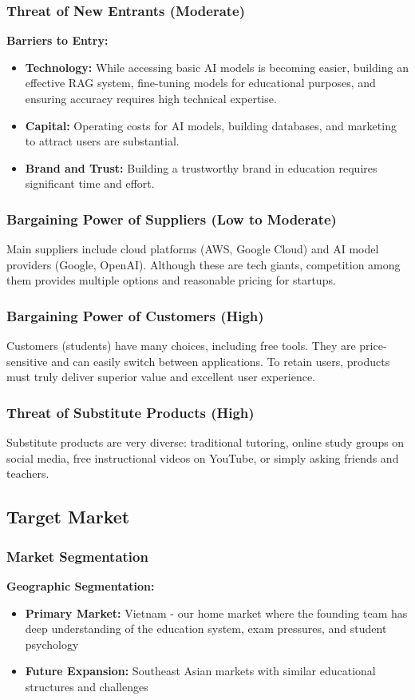 \subsubsection{Threat of New Entrants (Moderate)}
\textbf{Barriers to Entry:}
\begin{itemize}
    \item \textbf{Technology:} While accessing basic AI models is becoming easier, building an effective RAG system, fine-tuning models for educational purposes, and ensuring accuracy requires high technical expertise.
    \item \textbf{Capital:} Operating costs for AI models, building databases, and marketing to attract users are substantial.
    \item \textbf{Brand and Trust:} Building a trustworthy brand in education requires significant time and effort.
\end{itemize}

\subsubsection{Bargaining Power of Suppliers (Low to Moderate)}
Main suppliers include cloud platforms (AWS, Google Cloud) and AI model providers (Google, OpenAI). Although these are tech giants, competition among them provides multiple options and reasonable pricing for startups.

\subsubsection{Bargaining Power of Customers (High)}
Customers (students) have many choices, including free tools. They are price-sensitive and can easily switch between applications. To retain users, products must truly deliver superior value and excellent user experience.

\subsubsection{Threat of Substitute Products (High)}
Substitute products are very diverse: traditional tutoring, online study groups on social media, free instructional videos on YouTube, or simply asking friends and teachers.

\subsection{Target Market}
\subsubsection{Market Segmentation}
\textbf{Geographic Segmentation:}
\begin{itemize}
    \item \textbf{Primary Market:} Vietnam - our home market where the founding team has deep understanding of the education system, exam pressures, and student psychology
    \item \textbf{Future Expansion:} Southeast Asian markets with similar educational structures and challenges
\end{itemize}

